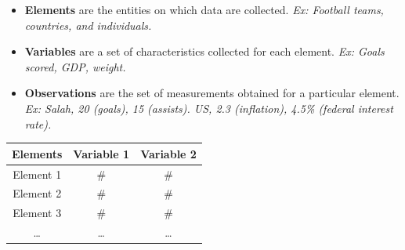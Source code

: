 \documentclass[
  11pt,
  letterpaper,
  DIV=11,
  numbers=noendperiod,
  oneside,
  open=any]{scrreprt}
\begin{document}
\begin{itemize}
\item
  \textbf{Elements} are the entities on which data are collected.
  \emph{Ex: Football teams, countries, and individuals.}
\item
  \textbf{Variables} are a set of characteristics collected for each
  element. \emph{Ex: Goals scored, GDP, weight.}
\item
  \textbf{Observations} are the set of measurements obtained for a
  particular element. \emph{Ex: Salah, 20 (goals), 15 (assists). US, 2.3
  (inflation), 4.5\% (federal interest rate).}
\end{itemize}

\begin{center}
\begin{tabular}{ccc}
\toprule
Elements & Variable 1 & Variable 2 \\
\midrule
Element 1 & \# & \# \\
Element 2 & \# & \# \\
Element 3 & \# & \# \\
\ldots{} & \ldots{} & \ldots{} \\
\bottomrule
\end{tabular}
\end{center}
\end{document}
